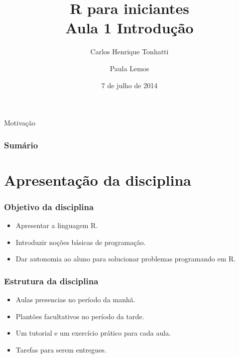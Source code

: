 \documentclass{beamer}
\title[Linguagem R]{R para iniciantes\\ Aula 1 Introdução }
\author {Carlos Henrique Tonhatti\\ \and Paula Lemos}
\institute[Unicamp]{Universidade Estadual de Campinas}
\date{7 de julho  de 2014}
\begin{document}
\frame{\titlepage} %

\begin{frame}{Motivação}
  \begin{center}
     
    \end{center}


  
\end{frame}
\begin{frame}
 \frametitle{Sumário}
 \tableofcontents[pausesections]
  \setcounter{tocdepth}{2}%
\end{frame}


\section{Apresentação da disciplina}
\begin{frame}
  \begin{center}
  \frametitle{Objetivo da disciplina}

  \begin{itemize}
  \item Apresentar a linguagem R. 
  \item Introduzir noções básicas de programação.
  \item Dar autonomia ao aluno para solucionar problemas programando em R. 
 \end{itemize}
\end{center}
\end{frame}


\begin{frame}
\begin{center}
  \frametitle{Estrutura da disciplina}
  \begin{itemize}
  \item Aulas presencias no período da manhã.
  \item Plantões  facultativos no  período da tarde.
  \item Um tutorial e um exercício prático para cada aula.
  \item Tarefas para serem entregues.
  \end{itemize}
\end{center}
\end{frame}
\end{document}
